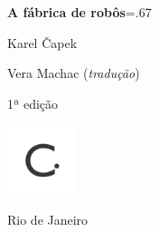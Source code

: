 




\begingroup\thispagestyle{empty}\vspace*{-.01\textheight}\parindent=0pt 
              \formular
              \Huge 
              \textbf{A fábrica de robôs}\baselineskip=.67\baselineskip 

              \vspace{15mm}
              
              \LARGE
              Karel Čapek
              
              \vspace{5cm}

              \newfontfamily{}
              {\selectfont\minion\small
              Vera Machac (\textit{tradução})}
              
              {\selectfont\minion\footnotesize
              1ª edição}
                    
              \vfill

              \includegraphics[width=2cm]{../logocircuito.png}
              
       

              {\selectfont\minion\small
              Rio de Janeiro \quad\the\year}
\endgroup

\pagebreak
